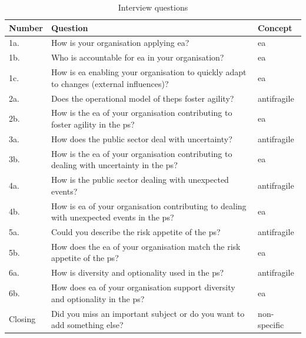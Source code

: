 \begin{table}[H]
	\begin{center}
		\begin{tabular}{@{}p{}p{}p{}@{}}
			\toprule
			\textbf{Number} & \textbf{Question} & \textbf{Concept} \\ \midrule %
			1a. & How is your organisation applying \acrshort{ea}? & \acrshort{ea} \\%
			1b. & Who is accountable for \acrshort{ea} in your organisation? & \acrshort{ea} \\%
			1c. & How is \acrshort{ea} enabling your organisation to quickly adapt to changes (external influences)? & \acrshort{ea} \\%
			2a. & Does the operational model of the\gls{ps} \gls{foster} \gls{agility}? & \Gls{antifragile} \\%
			2b. & How is the \acrshort{ea} of your organisation contributing to \gls{foster} \gls{agility} in the \gls{ps}? & \acrshort{ea} \\%
			3a. & How does the public sector deal with \gls{uncertainty}? & \Gls{antifragile} \\%
			3b. & How is the \acrshort{ea} of your organisation contributing to dealing with \gls{uncertainty} in the \gls{ps}?
			& \acrshort{ea} \\%
			4a. & How is the public sector dealing with unexpected events? & \Gls{antifragile} \\%
			4b. & How is \acrshort{ea} of your organisation contributing to dealing with unexpected events in the \gls{ps}? & \acrshort{ea} \\%
			5a. & Could you describe the risk appetite of the \gls{ps}? & \Gls{antifragile} \\%
			5b. & How does the \acrshort{ea} of your organisation match the risk appetite of the \gls{ps}?
			& \acrshort{ea} \\%
			6a. & How is \gls{diversity} and \gls{optionality} used in the \gls{ps}? & \Gls{antifragile} \\%
			6b. & How does \acrshort{ea} of your organisation support \gls{diversity} and \gls{optionality} in the \gls{ps}? & \acrshort{ea} \\%
			Closing & Did you miss an important subject or do you want to add something else? & non-specific \\%
			\bottomrule
		\end{tabular}
		\caption[Interview questions]{Interview questions}
		\label{tab:interviewquestions}
	\end{center}
\end{table}
